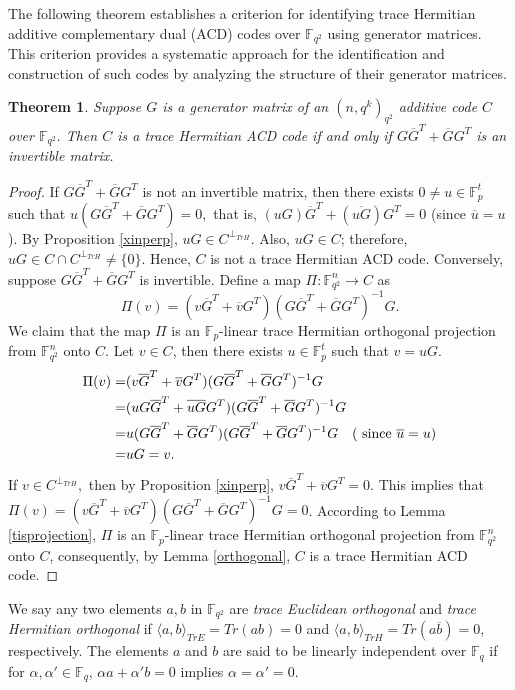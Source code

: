 \documentclass[sn-mathphys-num]{sn-jnl}%
\theoremstyle{thmstyleone}%
\newtheorem{theorem}{Theorem}%
\theoremstyle{thmstyletwo}%
\theoremstyle{thmstylethree}%
\begin{document}
The following theorem establishes a criterion for identifying trace Hermitian additive complementary dual (ACD) codes over $\mathbb{F}_{q^2}$ using generator matrices. This criterion provides a systematic approach for the identification and construction of such codes by analyzing the structure of their generator matrices.
\begin{theorem} \label{hermitian acd}
	Suppose $G$ is a generator matrix of an $(n,q^k)_{q^2}$ additive code $C$ over $\mathbb{F}_{q^2}.$ Then $C$ is  a trace Hermitian ACD  code if and only if $G\overline{G}^T+\overline{G}G^T$ is an invertible matrix.
\end{theorem}
\begin{proof}
	If $G\overline{G}^T+\overline{G}G^T$ is not an invertible matrix, then there exists $0\neq u\in \mathbb{F}^t_{p}$ such that
	$u(G\overline{G}^T+\overline{G}G^T)=0,$ that is,    $(uG)\overline{G}^T+(\overline{uG})G^T=0$ (since $\overline{u}=u$). By Proposition  \ref{xinperp}, $uG\in C^{\perp_{TrH}}.$   Also, $uG\in C$; therefore, $uG \in C\cap C^{\perp_{TrH}}\neq \{0\}.$ Hence, $C$ is not a trace Hermitian ACD code. Conversely, suppose $G\overline{G}^T+\overline{G}G^T$ is invertible. Define a map  $\Pi: \mathbb{F}_{q^2}^n \to C$ as
	$$\Pi(v)=(v\overline{G}^T+\overline{v}G^T)(G\overline{G}^T+\overline{G}G^T)^{-1}G. $$
	We claim that the map $\Pi$ is an $\mathbb{F}_p$-linear trace Hermitian orthogonal projection from $\mathbb{F}_{q^2}^n$ onto $C.$ 
	Let $v\in C$, then there exists $u\in\mathbb{F}_p^t $ such that $v=uG.$
	\begin{align*}
		\Pi(v)=&(v\overline{G}^T+\overline{v}G^T)(G\overline{G}^T+\overline{G}G^T)^{-1}G\\
		=&(uG\overline{G}^T+\overline{uG}G^T)(G\overline{G}^T+\overline{G}G^T)^{-1}G\\
		=&u(G\overline{G}^T+\overline{G}G^T)(G\overline{G}^T+\overline{G}G^T)^{-1}G\  \ \text{ ( since $ \overline{u}=u$)}\\
		=&uG=v.
	\end{align*} 
	If $v\in C^{\perp_{TrH}},$ then by Proposition \ref{xinperp}, $v\overline{G}^T+\overline{v}G^T=0.$ This implies that $\Pi(v)=(v\overline{G}^T+\overline{v}G^T)(G\overline{G}^T+\overline{G}G^T)^{-1}G=0$. According to Lemma \ref{tisprojection}, $\Pi$ is an $\mathbb{F}_p$-linear trace Hermitian orthogonal projection from $\mathbb{F}_{q^2}^n$ onto $C$, consequently, by Lemma \ref{orthogonal}, $C$ is a trace Hermitian ACD code.
\end{proof}
We say any two elements $a, b$ in $\mathbb{F}_{q^2}$ are \textit{trace Euclidean  orthogonal} and  \textit{trace Hermitian  orthogonal} if $\langle a,b\rangle_{TrE}=Tr(ab)=0$ and $\langle a,b\rangle_{TrH}=Tr(a\overline{b})=0$, respectively. The elements $a$ and $b$ are said to be linearly independent over $\mathbb{F}_q$ if for $\alpha, \alpha' \in \mathbb{F}_q$, $\alpha a+\alpha' b=0$ implies $\alpha=\alpha'=0.$
\end{document}
